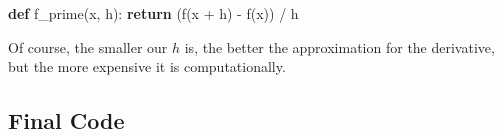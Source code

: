 \documentclass[
]{article}
\newenvironment{Shaded}{}{}
\newcommand{\ControlFlowTok}[1]{\textcolor[rgb]{0.00,0.44,0.13}{\textbf{#1}}}
\newcommand{\KeywordTok}[1]{\textcolor[rgb]{0.00,0.44,0.13}{\textbf{#1}}}
\newcommand{\NormalTok}[1]{#1}
\newcommand{\OperatorTok}[1]{\textcolor[rgb]{0.40,0.40,0.40}{#1}}
\begin{document}
\begin{Shaded}
\begin{Highlighting}[]
\KeywordTok{def}\NormalTok{ f\_prime(x, h):}
    \ControlFlowTok{return}\NormalTok{ (f(x }\OperatorTok{+}\NormalTok{ h) }\OperatorTok{{-}}\NormalTok{ f(x)) }\OperatorTok{/}\NormalTok{ h}
\end{Highlighting}
\end{Shaded}

Of course, the smaller our \(h\) is, the better the approximation for
the derivative, but the more expensive it is computationally.

\hypertarget{header-n83}{%
\subsection{Final Code}\label{header-n83}}
\end{document}
